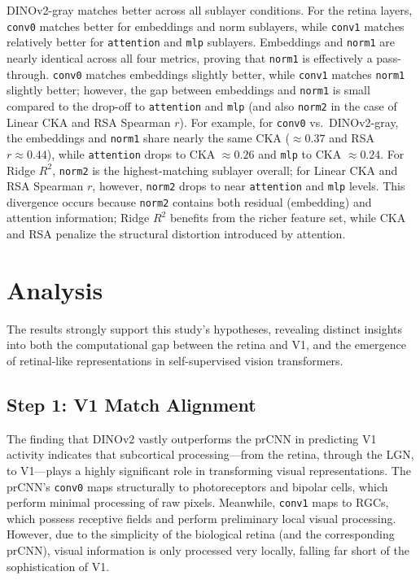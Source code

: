 \documentclass{article}
\begin{document}
DINOv2-gray matches better across all sublayer conditions. For the
retina layers, \texttt{conv0} matches better for embeddings
and norm sublayers, while \texttt{conv1} matches relatively better
for \texttt{attention} and \texttt{mlp} sublayers.
Embeddings and \texttt{norm1} are nearly identical across all four
metrics, proving that \texttt{norm1} is effectively a pass-through.
\texttt{conv0} matches embeddings slightly better, while
\texttt{conv1} matches \texttt{norm1} slightly better; however, the
gap between embeddings and \texttt{norm1} is small compared to the
drop-off to \texttt{attention} and \texttt{mlp} (and also \texttt{norm2}
in the case of Linear CKA and RSA Spearman $r$).
For example, for \texttt{conv0} vs.\ DINOv2-gray, the
embeddings and \texttt{norm1} share nearly the same CKA ($\approx 0.37$
and RSA $r \approx 0.44$), while \texttt{attention} drops to CKA $\approx 0.26$
and \texttt{mlp} to CKA $\approx 0.24$.
For Ridge $R^2$, \texttt{norm2} is the highest-matching sublayer overall;
for Linear CKA and RSA Spearman $r$, however, \texttt{norm2} drops to
near \texttt{attention} and \texttt{mlp} levels. This divergence
occurs because \texttt{norm2} contains both residual (embedding) and
attention information; Ridge $R^2$ benefits from the richer feature
set, while CKA and RSA penalize the structural distortion introduced by attention.

\section{Analysis}
The results strongly support this study's hypotheses, revealing
distinct insights into both the computational gap between the retina
and V1, and the emergence of retinal-like representations in
self-supervised vision transformers.

\subsection{Step 1: V1 Match Alignment}
The finding that DINOv2 vastly outperforms the prCNN in
predicting V1 activity indicates that subcortical processing—from the
retina, through the LGN, to V1—plays a highly significant role in
transforming visual representations. The prCNN's \texttt{conv0}
maps structurally to photoreceptors and bipolar cells, which perform
minimal processing of raw pixels. Meanwhile, \texttt{conv1} maps to
RGCs, which possess receptive fields and perform preliminary local
visual processing. However, due to the simplicity of the biological
retina (and the corresponding prCNN), visual information
is only processed very locally, falling far short of the
sophistication of V1.
\end{document}

